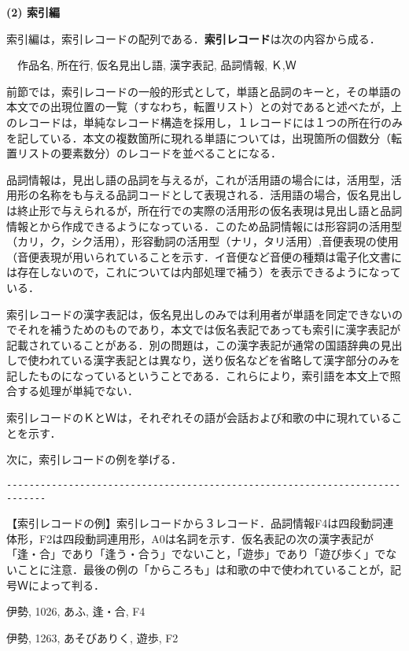 \noindent
{\bf (2) 索引編}

索引編は，索引レコードの配列である．{\bf 索引レコード}は次の内容から成る．

　作品名, 所在行, 仮名見出し語, 漢字表記, 品詞情報, Ｋ,Ｗ

前節では，索引レコードの一般的形式として，単語と品詞のキーと，その単語の本文での出現位置の一覧（すなわち，転置リスト）との対であると述べたが，上のレコードは，単純なレコード構造を採用し，１レコードには１つの所在行のみを記している．本文の複数箇所に現れる単語については，出現箇所の個数分（転置リストの要素数分）のレコードを並べることになる．

品詞情報は，見出し語の品詞を与えるが，これが活用語の場合には，活用型，活用形の名称をも与える品詞コードとして表現される．活用語の場合，仮名見出しは終止形で与えられるが，所在行での実際の活用形の仮名表現は見出し語と品詞情報とから作成できるようになっている．このため品詞情報には形容詞の活用型（カリ，ク，シク活用），形容動詞の活用型（ナリ，タリ活用）,音便表現の使用（音便表現が用いられていることを示す．イ音便など音便の種類は電子化文書には存在しないので，これについては内部処理で補う）を表示できるようになっている．

索引レコードの漢字表記は，仮名見出しのみでは利用者が単語を同定できないのでそれを補うためのものであり，本文では仮名表記であっても索引に漢字表記が記載されていることがある．別の問題は，この漢字表記が通常の国語辞典の見出しで使われている漢字表記とは異なり，送り仮名などを省略して漢字部分のみを記したものになっているということである．これらにより，索引語を本文上で照合する処理が単純でない．

索引レコードのＫとＷは，それぞれその語が会話および和歌の中に現れていることを示す．

次に，索引レコードの例を挙げる．

\vspace{-8pt}\begin{verbatim}
-----------------------------------------------------------------------------
\end{verbatim}\vspace{-8pt}
\noindent
【索引レコードの例】索引レコードから３レコード．品詞情報F4は四段動詞連体形，F2は四段動詞連用形，A0は名詞を示す．仮名表記の次の漢字表記が「逢・合」であり「逢う・合う」でないこと，「遊歩」であり「遊び歩く」でないことに注意．最後の例の「からころも」は和歌の中で使われていることが，記号Ｗによって判る．

伊勢, 1026, あふ, 逢・合, F4

伊勢, 1263, あそびありく, 遊歩, F2　　

